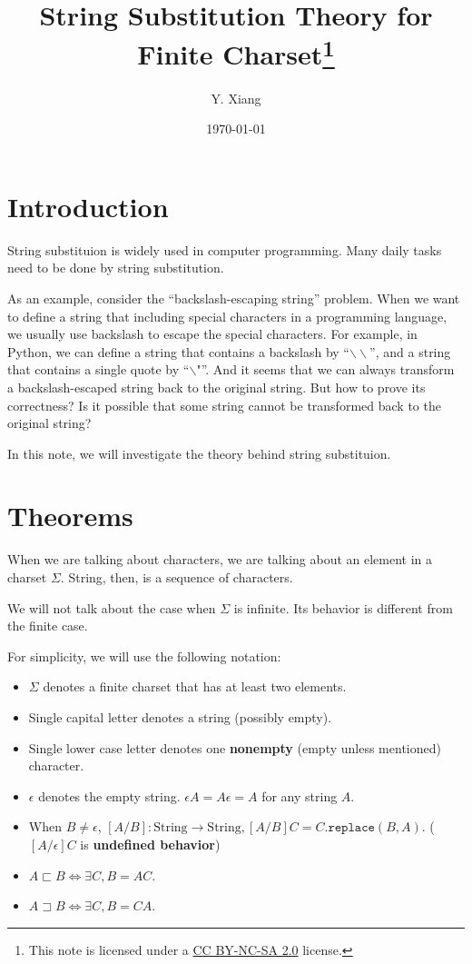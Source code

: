 \documentclass{article}
\title{\vspace{-3em}String Substitution Theory for Finite Charset\footnote{This note is licensed under a \href{https://creativecommons.org/licenses/by-nc-sa/2.0/}{CC BY-NC-SA 2.0} license.}\quad}
\author{Y. Xiang\vspace{1em}}
\date{\today\vspace{-1em}}
\theoremstyle{definition}
\begin{document}
\maketitle

\section{Introduction}

String substituion is widely used in computer programming. Many daily tasks need to be done by string substitution.

As an example, consider the ``backslash-escaping string'' problem.
When we want to define a string that including special characters in a programming language, we usually use backslash to escape the special characters. For example, in Python, we can define a string that contains a backslash by ``$\backslash \backslash$'', and a string that contains a single quote by ``$\backslash \texttt{"}$''. And it seems that we can always transform a backslash-escaped string back to the original string. But how to prove its correctness? Is it possible that some string cannot be transformed back to the original string?

In this note, we will investigate the theory behind string substituion.

\section{Theorems}

When we are talking about characters, we are talking about an element in a charset $\Sigma$. String, then, is a sequence of characters.

We will not talk about the case when $\Sigma$ is infinite. Its behavior is different from the finite case.

For simplicity, we will use the following notation:

\begin{itemize}
    \item $\Sigma$ denotes a finite charset that has at least two elements.
    \item Single capital letter denotes a string (possibly empty).
    \item Single lower case letter denotes one \textbf{nonempty} (empty unless mentioned) character.
    \item $\epsilon$ denotes the empty string. $\epsilon A=A\epsilon=A$ for any string $A$.
    \item When $B\neq \epsilon$, $[A/B]: \text{String} \rightarrow \text{String}, [A/B]C=C.\mathtt{replace}(B, A)$. ($[A/\epsilon]C$ is \textbf{undefined behavior})
    \item $A\sqsubset B\Leftrightarrow \exists C, B = AC$.
    \item $A\sqsupset B\Leftrightarrow \exists C, B = CA$.
\end{itemize}
\end{document}
